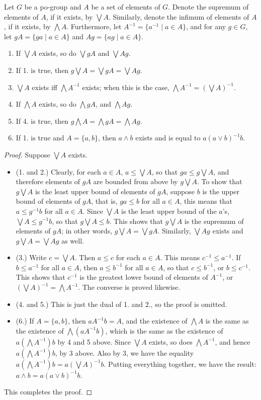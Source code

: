 \documentclass[12pt]{article}
\begin{document}
Let $G$ be a po-group and $A$ be a set of elements of $G$.  Denote the supremum of elements of $A$, if it exists, by $\bigvee A$.  Similarly, denote the infimum of elements of $A$, if it exists, by $\bigwedge A$.  Furthermore, let $A^{-1}=\lbrace a^{-1}\mid a\in A\rbrace$, and for any $g\in G$, let $gA=\lbrace ga\mid a\in A\rbrace$ and $Ag=\lbrace ag\mid a\in A\rbrace$.
\begin{enumerate}
\item If $\bigvee A$ exists, so do $\bigvee gA$ and $\bigvee Ag$.
\item If 1. is true, then $g\bigvee A=\bigvee gA =\bigvee Ag$.
\item $\bigvee A$ exists iff $\bigwedge A^{-1}$ exists; when this is the case, $\bigwedge A^{-1}=(\bigvee A)^{-1}$.  
\item If $\bigwedge A$ exists, so do $\bigwedge gA$, and $\bigwedge Ag$.
\item If 4. is true, then $g\bigwedge A=\bigwedge gA=\bigwedge Ag$.
\item If 1. is true and $A=\lbrace a,b\rbrace$, then $a\wedge b$ exists and is equal to $a(a\vee b)^{-1}b$.
\end{enumerate}

\begin{proof}  Suppose $\bigvee A$ exists.
\begin{itemize}
\item (1. and 2.)  Clearly, for each $a\in A$, $a\le \bigvee A$, so that $ga\le g\bigvee A$, and therefore elements of $gA$ are bounded from above by $g\bigvee A$.  To show that $g\bigvee A$ is the least upper bound of elements of $gA$, suppose $b$ is the upper bound of elements of $gA$, that is, $ga\le b$ for all $a\in A$, this means that $a\le g^{-1}b$ for all $a\in A$.  Since $\bigvee A$ is the least upper bound of the $a$'s, $\bigvee A\le g^{-1}b$, so that $g\bigvee A \le b$.  This shows that $g\bigvee A$ is the supremum of elements of $gA$; in other words, $g\bigvee A=\bigvee gA$.  Similarly, $\bigvee Ag$ exists and $g\bigvee A=\bigvee Ag$ as well.
\item (3.)  Write $c=\bigvee A$.  Then $a\le c$ for each $a\in A$.  This means $c^{-1}\le a^{-1}$.  If $b\le a^{-1}$ for all $a\in A$, then $a\le b^{-1}$ for all $a\in A$, so that $c\le b^{-1}$, or $b\le c^{-1}$.  This shows that $c^{-1}$ is the greatest lower bound of elements of $A^{-1}$, or $(\bigvee A)^{-1}=\bigwedge A^{-1}$.  The converse is proved likewise.
\item (4. and 5.)  This is just the dual of 1. and 2., so the proof is omitted.
\item (6.)  If $A=\lbrace a,b\rbrace$, then $aA^{-1}b=A$, and the existence of $\bigwedge A$ is the same as the existence of $\bigwedge (aA^{-1}b)$, which is the same as the existence of $a (\bigwedge A^{-1}) b$ by 4 and 5 above.  Since $\bigvee A$ exists, so does $\bigwedge A^{-1}$, and hence $a (\bigwedge A^{-1}) b$, by 3 above.  Also by 3, we have the equality $a (\bigwedge A^{-1}) b=a(\bigvee A)^{-1} b$.  Putting everything together, we have the result: $a\wedge b=a(a\vee b)^{-1}b$.
\end{itemize}
This completes the proof.
\end{proof}
\end{document}
